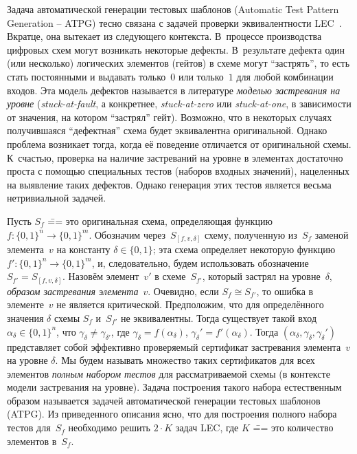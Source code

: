 Задача автоматической генерации тестовых шаблонов (Automatic Test Pattern Generation \--- ATPG) тесно связана с задачей проверки эквивалентности LEC~\cite{drechsler2021}.
Вкратце, она вытекает из следующего контекста.
В~процессе производства цифровых схем могут возникать некоторые дефекты.
В~результате дефекта один (или несколько) логических элементов (гейтов) в схеме могут \enquote{застрять}, то есть стать постоянными и выдавать только~$0$ или только~$1$ для любой комбинации входов.
Эта модель дефектов называется в литературе \textit{моделью застревания на уровне} (\textit{stuck-at-fault}, а конкретнее, \textit{stuck-at-zero} или \textit{stuck-at-one}, в зависимости от значения, на котором \enquote{застрял} гейт).
Возможно, что в некоторых случаях получившаяся \enquote{дефектная} схема будет эквивалентна оригинальной.
Однако проблема возникает тогда, когда её поведение отличается от оригинальной схемы.
К~счастью, проверка на наличие застреваний на уровне в элементах достаточно проста с помощью специальных тестов (наборов входных значений), нацеленных на выявление таких дефектов.
Однако генерация этих тестов является весьма нетривиальной задачей.

Пусть $S_f$ \=== это оригинальная схема, определяющая функцию $f \colon \{0,1\}^n \to \{0,1\}^m$.
Обозначим через~$S_{[f,v,\delta]}$ схему, полученную из~$S_f$ заменой элемента~$v$ на константу $\delta \in \{0,1\}$; эта схема определяет некоторую функцию $f' \colon \{0,1\}^n \to \{0,1\}^m$, и, следовательно, будем использовать обозначение $S_{f'} = S_{[f,v,\delta]}$.
Назовём элемент~$v'$ в схеме~$S_{f'}$, который застрял на уровне~$\delta$, \textit{образом застревания элемента}~$v$.
Очевидно, если $S_f \cong S_{f'}$, то ошибка в элементе~$v$ не является критической.
Предположим, что для определённого значения $\delta$ схемы $S_f$ и~$S_{f'}$ не эквивалентны.
Тогда существует такой вход $\alpha_\delta \in \{0,1\}^n$, что $\gamma_\delta \neq \gamma_{\delta'}$, где $\gamma_\delta = f(\alpha_\delta)$, $\gamma_\delta' = f'(\alpha_\delta)$.
Тогда $(\alpha_\delta, \gamma_\delta, \gamma_\delta')$ представляет собой эффективно проверяемый сертификат застревания элемента~$v$ на уровне $\delta$.
Мы будем называть множество таких сертификатов для всех элементов \textit{полным набором тестов} для рассматриваемой схемы (в контексте модели застревания на уровне).
Задача построения такого набора естественным образом называется задачей автоматической генерации тестовых шаблонов (ATPG).
Из приведенного описания ясно, что для построения полного набора тестов для~$S_f$ необходимо решить $2 \cdot K$ задач LEC, где $K$ \=== это количество элементов в~$S_f$.

